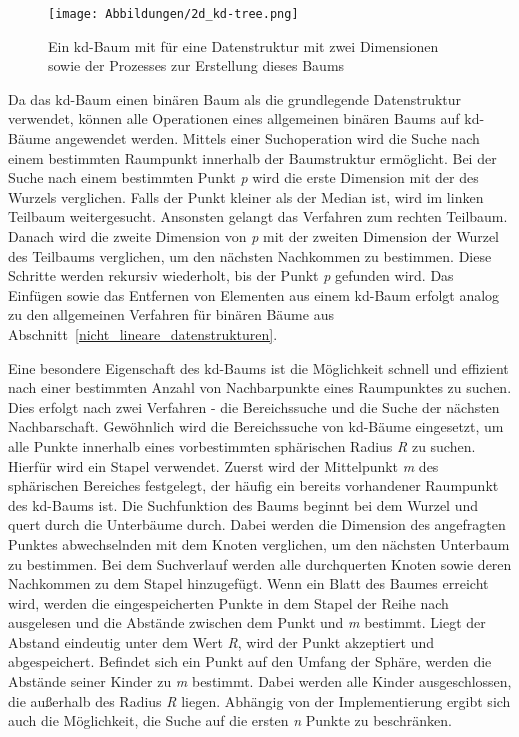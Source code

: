 
\begin{figure}[!b]
	\texttt{[image: Abbildungen/2d\_kd-tree.png]}
	\centering
	\caption[kd-Baum einer zweidimensionaler Datenstruktur]{Ein kd-Baum mit für eine Datenstruktur mit zwei Dimensionen sowie der Prozesses zur Erstellung dieses Baums \autocite[60]{garcia-garcia_alberto_towards_2015}}
	\label{fig: kd-tree_creation}
\end{figure}

Da das kd-Baum einen binären Baum als die grundlegende Datenstruktur verwendet, können alle Operationen eines allgemeinen binären Baums auf kd-Bäume angewendet werden. Mittels einer Suchoperation wird die Suche nach einem bestimmten Raumpunkt innerhalb der Baumstruktur ermöglicht. Bei der Suche nach einem bestimmten Punkt \textit{p} wird die erste Dimension mit der des Wurzels verglichen. Falls der Punkt kleiner als der Median ist, wird im linken Teilbaum weitergesucht. Ansonsten gelangt das Verfahren zum rechten Teilbaum. Danach wird die zweite Dimension von \textit{p} mit der zweiten Dimension der Wurzel des Teilbaums verglichen, um den nächsten Nachkommen zu bestimmen. Diese Schritte werden rekursiv wiederholt, bis der Punkt \textit{p} gefunden wird. Das Einfügen sowie das Entfernen von Elementen aus einem kd-Baum erfolgt analog zu den allgemeinen Verfahren für binären Bäume aus Abschnitt~\ref{nicht_lineare_datenstrukturen}. \autocite[94]{saha_advanced_2019}

Eine besondere Eigenschaft des kd-Baums ist die Möglichkeit schnell und effizient nach einer bestimmten Anzahl von Nachbarpunkte eines Raumpunktes zu suchen. Dies erfolgt nach zwei Verfahren - die Bereichssuche und die Suche der nächsten Nachbarschaft. Gewöhnlich wird die Bereichssuche von kd-Bäume eingesetzt, um alle Punkte innerhalb eines vorbestimmten sphärischen Radius \textit{R} zu suchen. Hierfür wird ein Stapel verwendet. Zuerst wird der Mittelpunkt \textit{m} des sphärischen Bereiches festgelegt, der häufig ein bereits vorhandener Raumpunkt des kd-Baums ist. Die Suchfunktion des Baums beginnt bei dem Wurzel und quert durch die Unterbäume durch. Dabei werden die Dimension des angefragten Punktes abwechselnden mit dem Knoten verglichen, um den nächsten Unterbaum zu bestimmen. Bei dem Suchverlauf werden alle durchquerten Knoten sowie deren Nachkommen zu dem Stapel hinzugefügt. Wenn ein Blatt des Baumes erreicht wird, werden die eingespeicherten Punkte in dem Stapel der Reihe nach ausgelesen und die Abstände zwischen dem Punkt und \textit{m} bestimmt. Liegt der Abstand eindeutig unter dem Wert \textit{R}, wird der Punkt akzeptiert und abgespeichert. Befindet sich ein Punkt auf den Umfang der Sphäre, werden die Abstände seiner Kinder zu \textit{m} bestimmt. Dabei werden alle Kinder ausgeschlossen, die außerhalb des Radius \textit{R} liegen. Abhängig von der Implementierung ergibt sich auch die Möglichkeit, die Suche auf die ersten \textit{n} Punkte zu beschränken. \autocite[95]{saha_advanced_2019}

